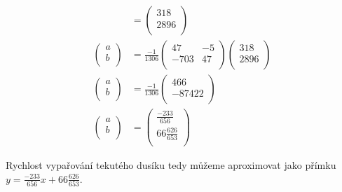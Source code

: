 \documentclass{../../../ksp}
\begin{document}
\begin{align*}
    &=
    \begin{pmatrix}
        318 \\
        2896 \\
    \end{pmatrix}
    \\
    \begin{pmatrix}
        a \\
        b \\
    \end{pmatrix}
    &=
    \frac{-1}{1306}
    \begin{pmatrix}
        47 & -5 \\
        -703 & 47 \\
    \end{pmatrix}
    \begin{pmatrix}
        318 \\
        2896 \\
    \end{pmatrix}
    \\
    \begin{pmatrix}
        a \\
        b \\
    \end{pmatrix}
    &=
    \frac{-1}{1306}
    \begin{pmatrix}
        466 \\
        -87422 \\
    \end{pmatrix}
    \\
    \begin{pmatrix}
        a \\
        b \\
    \end{pmatrix}
    &=
    \begin{pmatrix}
        \frac{-233}{656} \\
        66 \frac{626}{653} \\
    \end{pmatrix}
\end{align*}

Rychlost vypařování tekutého dusíku tedy můžeme aproximovat jako přímku
$y = \frac{-233}{656}x + 66 \frac{626}{653}$.
\end{document}
